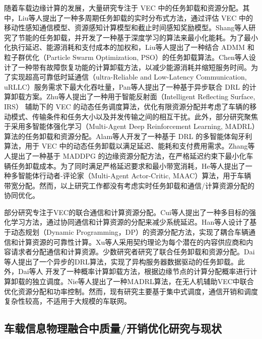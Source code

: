 随着车载边缘计算的发展，大量研究专注于 VEC 中的任务卸载和资源分配。其中，Liu等人\cite{liu2021rtds}提出了一种多周期任务卸载的实时分布式方法，通过评估 VEC 中的移动性感知通信模型、资源感知计算模型和截止时间感知奖励模型。Shang等人\cite{shang2021deep}研究了节能的任务卸载，并开发了一种基于深度学习的算法来最小化能耗。为了最小化执行延迟、能源消耗和支付成本的加权和，Liu等人\cite{liu2022a}提出了一种结合 ADMM 和粒子群优化（Particle Swarm Optimization, PSO）的任务卸载算法。Chen等人\cite{chen2020robust}设计了一种带有故障恢复功能的计算卸载方法，以减少能源消耗并缩短服务时间。为了实现超高可靠低时延通信（ultra-Reliable and Low-Latency Communication, uRLLC）服务需求下最大化吞吐量，Pan等人\cite{pan2022asynchronous}提出了一种基于异步联合 DRL 的计算卸载方案。Zhu等人\cite{zhu2022a}提出了一种用于智能反射面（Intelligent Reflecting Surface, IRS） 辅助下的 VEC 的动态任务调度算法，优化有限资源分配并考虑了车辆的移动模式、传输条件和任务大小以及并发传输之间的相互干扰。此外，部分研究聚焦于采用多智能体强化学习（Multi-Agent Deep Reinforcement Learning, MADRL）算法的任务卸载和资源分配。Alam等人\cite{alam2022multi}开发了一种基于 DRL 的多智能体匈牙利算法，用于 VEC 中的动态任务卸载以满足延迟、能耗和支付费用需求。Zhang等人\cite{zhang2021adaptive}提出了一种基于 MADDPG 的边缘资源分配方法，在严格延迟约束下最小化车辆任务卸载成本。为了同时满足严格延迟要求和最小带宽消耗，He等人\cite{he2021efficient}提出了一种多智能体行动者-评论家（Multi-Agent Actor-Critic, MAAC）算法，用于车辆带宽分配。然而，以上研究工作都没有考虑实时任务卸载和通信/计算资源分配的协同优化。

部分研究专注于VEC的联合通信和计算资源分配。Cui等人\cite{cui2021reinforcement}提出了一种多目标的强化学习方法，通过协同通信和计算资源的分配来减少系统延迟。Han等人\cite{han2020reliability}设计了基于动态规划（Dynamic Programming，DP）的资源分配方法，实现了耦合车辆通信和计算资源的可靠性计算。Xu等人\cite{xu2021socially}采用契约理论为每个潜在的内容供应商和内容请求者分配通信和计算资源。少数研究者研究了联合任务卸载和资源分配。Dai等人\cite{dai2021asynchronous}提出了一个异步的DRL算法，实现了异构服务器数据驱动的任务卸载。此外，Dai等人 \cite{dai2022a}开发了一种概率计算卸载方法，根据边缘节点的计算分配概率进行计算卸载的独立调度。Nie等人\cite{nie2021semi}提出了一种MADRL算法，在无人机辅助VEC中联合优化资源分配和功率控制。然而，现有研究主要基于集中式调度，通信开销和调度复杂性较高，不适用于大规模的车联网。

\subsection{车载信息物理融合中质量/开销优化研究与现状}

